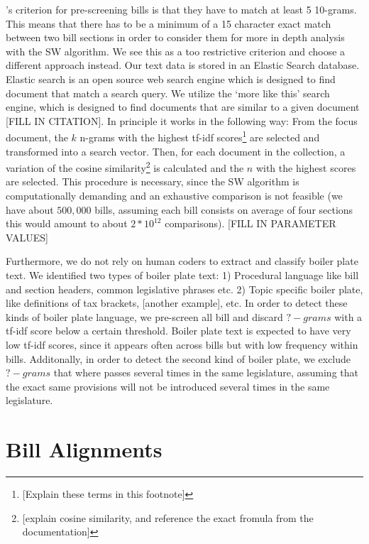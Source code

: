 \documentclass[12pt]{article} %
\begin{document}
\citet{wilkerson2015tracing}'s criterion for pre-screening bills is that they have to match at least 5 10-grams. This means that there has to be a minimum of a 15 character exact match between two bill sections in order to consider them for more in depth analysis with the SW algorithm. We see this as a too restrictive criterion and choose a different approach instead. Our text data is stored in an Elastic Search database. Elastic search is an open source web search engine which is designed to find document that match a search query. We utilize the `more like this' search engine, which is designed to find documents that are similar to a given document [FILL IN CITATION]. In principle it works in the following way: From the focus document, the $k$ n-grams with the highest tf-idf scores\footnote{[Explain these terms in this footnote]} are selected and transformed into a search vector. Then, for each document in the collection, a variation of the cosine similarity\footnote{[explain cosine similarity, and reference the exact fromula from the documentation]} is calculated and the $n$ with the highest scores are selected. This procedure is necessary, since the SW algorithm is computationally demanding and an exhaustive comparison is not feasible (we have about $500,000$ bills, assuming each bill consists on average of four sections this would amount to about $2 * 10^{12}$ comparisons). [FILL IN PARAMETER VALUES]

Furthermore, we do not rely on human coders to extract and classify boiler plate text. We identified two types of boiler plate text: 1) Procedural language like bill and section headers, common legislative phrases etc. 2) Topic specific boiler plate, like definitions of tax brackets, [another example], etc. In order to detect these kinds of boiler plate language, we pre-screen all bill and discard $?-grams$ with a tf-idf score below a certain threshold. Boiler plate text is expected to have very low tf-idf scores, since it appears often across bills but with low frequency within bills. Additonally, in order to detect the second kind of boiler plate, we exclude $?-grams$ that where passes several times in the same legislature, assuming that the exact same provisions will not be introduced several times in the same legislature.

\section{Bill Alignments}
\end{document}

